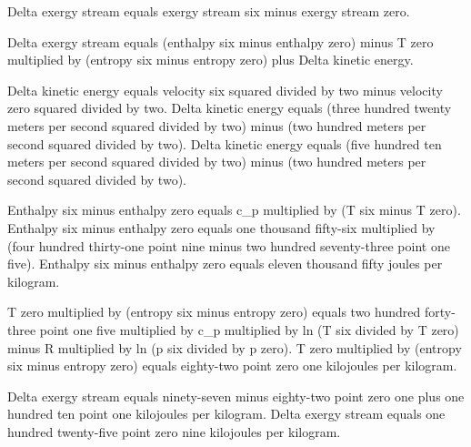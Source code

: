 Delta exergy stream equals exergy stream six minus exergy stream zero.  

Delta exergy stream equals (enthalpy six minus enthalpy zero) minus T zero multiplied by (entropy six minus entropy zero) plus Delta kinetic energy.  

Delta kinetic energy equals velocity six squared divided by two minus velocity zero squared divided by two.  
Delta kinetic energy equals (three hundred twenty meters per second squared divided by two) minus (two hundred meters per second squared divided by two).  
Delta kinetic energy equals (five hundred ten meters per second squared divided by two) minus (two hundred meters per second squared divided by two).  

Enthalpy six minus enthalpy zero equals c_p multiplied by (T six minus T zero).  
Enthalpy six minus enthalpy zero equals one thousand fifty-six multiplied by (four hundred thirty-one point nine minus two hundred seventy-three point one five).  
Enthalpy six minus enthalpy zero equals eleven thousand fifty joules per kilogram.  

T zero multiplied by (entropy six minus entropy zero) equals two hundred forty-three point one five multiplied by c_p multiplied by ln (T six divided by T zero) minus R multiplied by ln (p six divided by p zero).  
T zero multiplied by (entropy six minus entropy zero) equals eighty-two point zero one kilojoules per kilogram.  

Delta exergy stream equals ninety-seven minus eighty-two point zero one plus one hundred ten point one kilojoules per kilogram.  
Delta exergy stream equals one hundred twenty-five point zero nine kilojoules per kilogram.